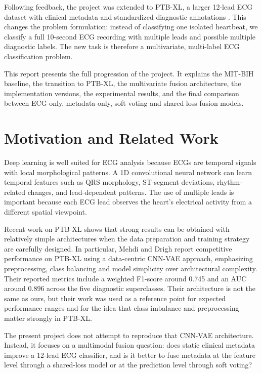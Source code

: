 \documentclass[11pt,a4paper]{article}
\begin{document}
Following feedback, the project was extended to PTB-XL, a larger 12-lead ECG dataset with clinical metadata and standardized diagnostic annotations \cite{wagner2020ptbxl}. This changes the problem formulation: instead of classifying one isolated heartbeat, we classify a full 10-second ECG recording with multiple leads and possible multiple diagnostic labels. The new task is therefore a multivariate, multi-label ECG classification problem.

This report presents the full progression of the project. It explains the MIT-BIH baseline, the transition to PTB-XL, the multivariate fusion architecture, the implementation versions, the experimental results, and the final comparison between ECG-only, metadata-only, soft-voting and shared-loss fusion models.

\section{Motivation and Related Work}

Deep learning is well suited for ECG analysis because ECGs are temporal signals with local morphological patterns. A 1D convolutional neural network can learn temporal features such as QRS morphology, ST-segment deviations, rhythm-related changes, and lead-dependent patterns. The use of multiple leads is important because each ECG lead observes the heart's electrical activity from a different spatial viewpoint.

Recent work on PTB-XL shows that strong results can be obtained with relatively simple architectures when the data preparation and training strategy are carefully designed. In particular, Mehdi and Drigh \cite{mehdi2026ptbxl} report competitive performance on PTB-XL using a data-centric CNN-VAE approach, emphasizing preprocessing, class balancing and model simplicity over architectural complexity. Their reported metrics include a weighted F1-score around 0.745 and an AUC around 0.896 across the five diagnostic superclasses. Their architecture is not the same as ours, but their work was used as a reference point for expected performance ranges and for the idea that class imbalance and preprocessing matter strongly in PTB-XL.

The present project does not attempt to reproduce that CNN-VAE architecture. Instead, it focuses on a multimodal fusion question: does static clinical metadata improve a 12-lead ECG classifier, and is it better to fuse metadata at the feature level through a shared-loss model or at the prediction level through soft voting?
\end{document}
